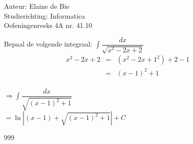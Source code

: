 \documentclass[a4paper]{article}
\begin{document}
  
\noindent \large Auteur: Elaine de Bie\\
\noindent \large Studierichting:  Informatica\\
\noindent \large Oefeningenreeks 4A nr. 41.10\\


\medskip


\normalsize 

Bepaal de volgende integraal:
$ \displaystyle\int \dfrac{dx}{\sqrt{x^2 - 2x + 2}} $\\

\begin{eqnarray*}
	x^2 - 2x + 2 &=& \left(x^2 - 2x + 1^2 \right) + 2 - 1 \\
	&=& \left(x - 1 \right)^2 + 1 \\
\end{eqnarray*}

$ \Rightarrow \displaystyle\int \dfrac{dx}{\sqrt{\left(x - 1 \right)^2 + 1}} $\\

$ = \ln \left| \left(x - 1\right) + \sqrt{\left(x - 1\right)^2 + 1} \right| + C $\\



\begin{thebibliography}{999}
\end{thebibliography}
\end{document}
